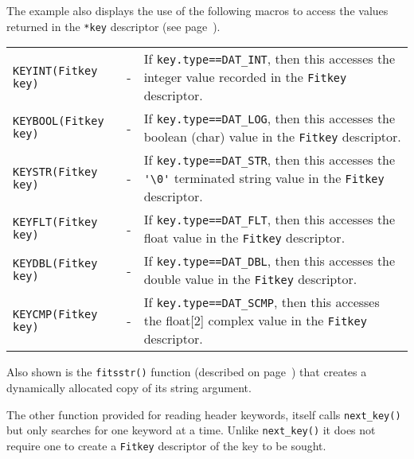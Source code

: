 The example also displays the use of the following macros to access
the values returned in the \verb`*key` descriptor (see
page~\pageref{Fitkey}).

\begin{tabular}{lcp{4.5in}}
 \verb`KEYINT(Fitkey key)` & - &  If \verb`key.type==DAT_INT`, then
          this accesses the integer value recorded in the
          \verb`Fitkey` descriptor. \\ 

 \verb`KEYBOOL(Fitkey key)` & - &  If \verb`key.type==DAT_LOG`, then
          this accesses the boolean (char) value in the \verb`Fitkey`
          descriptor. \\ 

 \verb`KEYSTR(Fitkey key)` & - &  If \verb`key.type==DAT_STR`, then
          this accesses the \verb`'\0'` terminated string value in the
          \verb`Fitkey` descriptor. \\ 

 \verb`KEYFLT(Fitkey key)` & - &  If \verb`key.type==DAT_FLT`, then
          this accesses the float value in the \verb`Fitkey`
          descriptor. \\ 

 \verb`KEYDBL(Fitkey key)` & - &  If \verb`key.type==DAT_DBL`, then
          this accesses the double value in the \verb`Fitkey`
          descriptor. \\ 

 \verb`KEYCMP(Fitkey key)` & - &  If \verb`key.type==DAT_SCMP`, then
          this accesses the float[2] complex value in the
          \verb`Fitkey` descriptor. \\ 
\end{tabular}

Also shown is the \verb`fitsstr()` function (described on
page~\pageref{fitsstr}) that creates a dynamically allocated
copy of its string argument.

The other function provided for reading header keywords, itself calls
\verb`next_key()` but only searches for one keyword at a time.
Unlike \verb`next_key()` it does not require one to create a \verb`Fitkey`
descriptor of the key to be sought.

